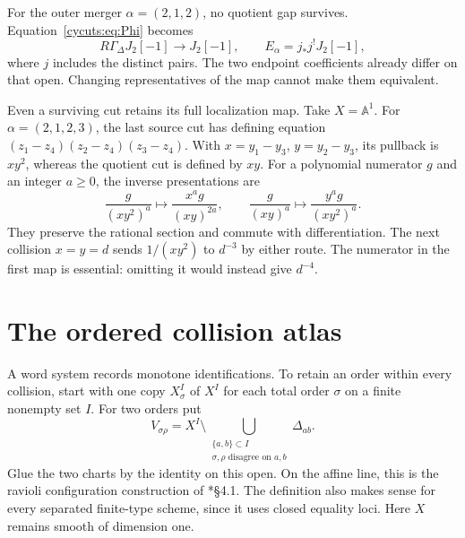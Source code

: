 For the outer merger $\alpha=(2,1,2)$, no quotient gap survives.
Equation~\eqref{cycuts:eq:Phi} becomes
\begin{equation}\label{cycuts:eq:outer-merger}
 R\Gamma_\Delta J_2[-1]\longrightarrow J_2[-1],
 \qquad E_\alpha=j_*j^!J_2[-1],
\end{equation}
where $j$ includes the distinct pairs. The two endpoint coefficients
already differ on that open. Changing representatives of the map
cannot make them equivalent.

Even a surviving cut retains its full localization map. Take $X=\mathbb A^1$.
For
$\alpha=(2,1,2,3)$, the last source cut has defining equation
$(z_1-z_4)(z_2-z_4)(z_3-z_4)$. With
$x=y_1-y_3$, $y=y_2-y_3$, its pullback is $xy^2$, whereas the
quotient cut is defined by $xy$. For a polynomial numerator $g$
and an integer $a\ge0$, the inverse presentations are
\begin{equation}\label{cycuts:eq:denominators}
 \frac{g}{(xy^2)^a}\longmapsto\frac{x^ag}{(xy)^{2a}},
 \qquad
 \frac{g}{(xy)^a}\longmapsto\frac{y^ag}{(xy^2)^a}.
\end{equation}
They preserve the rational section and commute with differentiation.
The next collision $x=y=d$ sends $1/(xy^2)$ to $d^{-3}$ by either
route. The numerator in the first map is essential: omitting it
would instead give $d^{-4}$.

\section{The ordered collision atlas}
\label{cycuts:sec:atlas}

A word system records monotone identifications. To retain an order
within every collision, start with one copy $X^I_\sigma$ of $X^I$
for each total order $\sigma$ on a finite nonempty set $I$.
For two orders put
\begin{equation}\label{cycuts:eq:overlap}
 V_{\sigma\rho}=X^I\setminus
 \bigcup_{\substack{\{a,b\}\subset I\\
               \sigma,\rho\text{ disagree on }a,b}}\Delta_{ab}.
\end{equation}
Glue the two charts by the identity on this open. On the affine line,
this is the ravioli configuration construction of
\cite{cycuts:AKY}*{\S4.1}. The definition also makes sense for every
separated finite-type scheme, since it uses closed equality loci.
Here $X$ remains smooth of dimension one.

